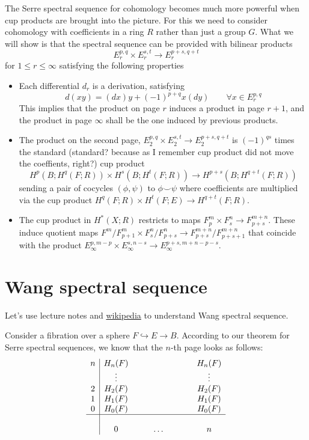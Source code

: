 The Serre spectral sequence for cohomology
becomes much more powerful when cup products
are brought into the picture. For this we
need to consider cohomology with coefficients
in a ring $R$ rather than just a group $G$.
What we will show is that the spectral
sequence can be provided with bilinear
products
$$E^{p,q}_{r}\times E^{s,t}_{r}\to
E^{p+s,q+t}_{r}$$
for $1\leq r\leq \infty$ satisfying the
following properties
\begin{itemize}
	\item Each differential $d_{r}$ is a
	derivation, satisfying
		$$d(xy)=(dx)y+(-1)^{p+q} x(dy)\qquad
		\forall x\in E^{p,q}_{r}$$
	This implies that the product on page $r$
	induces a product in page $r+1$, and the
	product in page $\infty$ shall be the one
	induced by previous products.
	\item The product on the second page,
	$E^{p,q}_{2}\times E^{s,t}_{2}\to
	E^{p+s,q+t}_{2}$ is $(-1)^{qs}$ times the
	standard (standard? because as I remember
	cup product did not move the coeffients,
	right?) cup product
		$$H^{p}(B;H^{q}(F;R))\times
		H^{s}(B;H^{t}(F;R))\to
		H^{p+s}(B;H^{q+t}(F;R))$$
		sending a pair of cocycles $(\phi,\psi)$ to
		$\phi\smile \psi$ where coefficients are
		multiplied via the cup product
		$H^{q}(F;R)\times H^{t}(F;E)\to
		H^{q+t}(F;R)$.
	\item The cup product in $H^{*}(X;R)$
	restricts to maps $F^{m}_{p}\times
	F^{n}_{s}\to F^{m+n}_{p+s}$. These induce
	quotient maps $F^{ m}/F^{m}_{p+1}\times
	F^{n}_s/F^{n}_{p+s}\to
	F^{m+n}_{p+s}/F^{m+n}_{p+s+1}$ that coincide
	with the product $E^{p,m-p}_{\infty}\times
	E^{s,n-s}_{\infty}\to
	E^{p+s,m+n-p-s}_{\infty}$.
\end{itemize}

\section{Wang spectral sequence}
\label{section-wang-spectral-sequence}

Let's use lecture notes and
\href{https://en.wikipedia.org/wiki/%
Spectral_sequence#Wang_sequence}{wikipedia}
to understand Wang spectral sequence.

Consider a fibration over a sphere
$F\hookrightarrow E\to B$. According to our
theorem for Serre spectral sequences, we know
that the $n$-th page looks as follows:
$$
\begin{array}{c|cccccccc}
	n&H_n(F)&&&&&&&H_{n}(F)\\
	 &\vdots&&&&&&&\vdots\\
	2&H_2(F)&&&&&&&H_2(F)\\
	1&H_1(F)&&&&&&&H_1(F)\\
	0&H_0(F)&&&&&&&H_0(F)\\
	\hline\\
	 &0&&&\ldots&&&&n
\end{array}
$$

